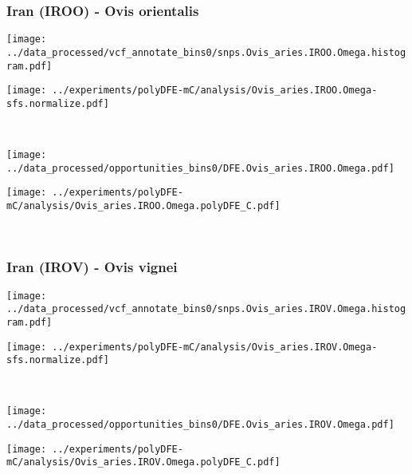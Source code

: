 \subsubsection{Iran (IROO) - Ovis orientalis}

\begin{minipage}{0.49\linewidth}
    \texttt{[image: ../data\_processed/vcf\_annotate\_bins0/snps.Ovis\_aries.IROO.Omega.histogram.pdf]}
\end{minipage}
\begin{minipage}{0.49\linewidth}
    \texttt{[image: ../experiments/polyDFE-mC/analysis/Ovis\_aries.IROO.Omega-sfs.normalize.pdf]}
\end{minipage}
\\
\begin{minipage}{0.49\linewidth}
    \texttt{[image: ../data\_processed/opportunities\_bins0/DFE.Ovis\_aries.IROO.Omega.pdf]}
\end{minipage}
\begin{minipage}{0.49\linewidth}
    \texttt{[image: ../experiments/polyDFE-mC/analysis/Ovis\_aries.IROO.Omega.polyDFE\_C.pdf]}
\end{minipage}
\\

\subsubsection{Iran (IROV) - Ovis vignei}

\begin{minipage}{0.49\linewidth}
    \texttt{[image: ../data\_processed/vcf\_annotate\_bins0/snps.Ovis\_aries.IROV.Omega.histogram.pdf]}
\end{minipage}
\begin{minipage}{0.49\linewidth}
    \texttt{[image: ../experiments/polyDFE-mC/analysis/Ovis\_aries.IROV.Omega-sfs.normalize.pdf]}
\end{minipage}
\\
\begin{minipage}{0.49\linewidth}
    \texttt{[image: ../data\_processed/opportunities\_bins0/DFE.Ovis\_aries.IROV.Omega.pdf]}
\end{minipage}
\begin{minipage}{0.49\linewidth}
    \texttt{[image: ../experiments/polyDFE-mC/analysis/Ovis\_aries.IROV.Omega.polyDFE\_C.pdf]}
\end{minipage}
\\

